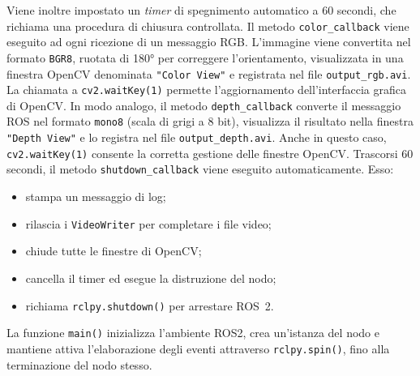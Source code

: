\documentclass[11pt]{report}
\begin{document}
Viene inoltre impostato un \textit{timer} di spegnimento automatico a 60 secondi, che richiama una procedura di chiusura controllata.
\newline
Il metodo \texttt{color\_callback} viene eseguito ad ogni ricezione di un messaggio RGB. L’immagine viene convertita nel formato \texttt{BGR8}, ruotata di 180° per correggere l’orientamento, visualizzata in una finestra OpenCV denominata \texttt{"Color View"} e registrata nel file \texttt{output\_rgb.avi}. La chiamata a \texttt{cv2.waitKey(1)} permette l’aggiornamento dell’interfaccia grafica di OpenCV.
\newline
In modo analogo, il metodo \texttt{depth\_callback} converte il messaggio ROS nel formato \texttt{mono8} (scala di grigi a 8 bit), visualizza il risultato nella finestra \texttt{"Depth View"} e lo registra nel file \texttt{output\_depth.avi}. Anche in questo caso, \texttt{cv2.waitKey(1)} consente la corretta gestione delle finestre OpenCV.
\newline
Trascorsi 60 secondi, il metodo \texttt{shutdown\_callback} viene eseguito automaticamente. Esso:
\begin{itemize}
  \item stampa un messaggio di log;
  \item rilascia i \texttt{VideoWriter} per completare i file video;
  \item chiude tutte le finestre di OpenCV;
  \item cancella il timer ed esegue la distruzione del nodo;
  \item richiama \texttt{rclpy.shutdown()} per arrestare ROS~2.
\end{itemize}

La funzione \texttt{main()} inizializza l'ambiente ROS2, crea un’istanza del nodo e mantiene attiva l’elaborazione degli eventi attraverso \texttt{rclpy.spin()}, fino alla terminazione del nodo stesso.
\end{document}
